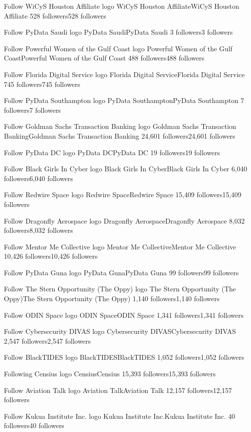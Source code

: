 Follow
WiCyS Houston Affiliate logo
WiCyS Houston AffiliateWiCyS Houston Affiliate
528 followers528 followers

Follow
PyData Saudi logo
PyData SaudiPyData Saudi
3 followers3 followers

Follow
Powerful Women of the Gulf Coast logo
Powerful Women of the Gulf CoastPowerful Women of the Gulf Coast
488 followers488 followers

Follow
Florida Digital Service logo
Florida Digital ServiceFlorida Digital Service
745 followers745 followers

Follow
PyData Southampton logo
PyData SouthamptonPyData Southampton
7 followers7 followers

Follow
Goldman Sachs Transaction Banking logo
Goldman Sachs Transaction BankingGoldman Sachs Transaction Banking
24,601 followers24,601 followers

Follow
PyData DC logo
PyData DCPyData DC
19 followers19 followers

Follow
Black Girls In Cyber logo
Black Girls In CyberBlack Girls In Cyber
6,040 followers6,040 followers

Follow
Redwire Space logo
Redwire SpaceRedwire Space
15,409 followers15,409 followers

Follow
Dragonfly Aerospace logo
Dragonfly AerospaceDragonfly Aerospace
8,032 followers8,032 followers

Follow
Mentor Me Collective logo
Mentor Me CollectiveMentor Me Collective
10,426 followers10,426 followers

Follow
PyData Guna logo
PyData GunaPyData Guna
99 followers99 followers

Follow
The Stern Opportunity (The Oppy) logo
The Stern Opportunity (The Oppy)The Stern Opportunity (The Oppy)
1,140 followers1,140 followers

Follow
ODIN Space logo
ODIN SpaceODIN Space
1,341 followers1,341 followers

Follow
Cybersecurity DIVAS logo
Cybersecurity DIVASCybersecurity DIVAS
2,547 followers2,547 followers

Follow
BlackTIDES logo
BlackTIDESBlackTIDES
1,052 followers1,052 followers

Following
Censius logo
CensiusCensius
15,393 followers15,393 followers

Follow
Aviation Talk logo
Aviation TalkAviation Talk
12,157 followers12,157 followers

Follow
Kukua Institute Inc. logo
Kukua Institute Inc.Kukua Institute Inc.
40 followers40 followers

